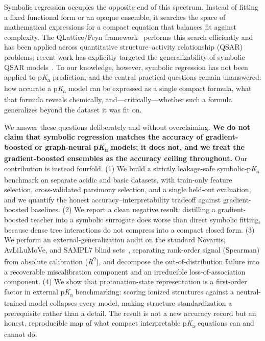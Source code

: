 \documentclass[11pt]{article}
\newcommand{\pka}{p\textit{K}\textsubscript{a}}
\newcommand{\rtwo}{\textit{R}\textsuperscript{2}}
\begin{document}
Symbolic regression occupies the opposite end of this spectrum. Instead of fitting a fixed
functional form or an opaque ensemble, it searches the space of mathematical expressions for
a compact equation that balances fit against complexity. The QLattice/Feyn
framework~\cite{brolos2021feyn} performs this search efficiently and has been applied across
quantitative structure--activity relationship (QSAR) problems; recent work has explicitly
targeted the generalizability of symbolic QSAR models~\cite{shirasawa2024figp2}. To our
knowledge, however, symbolic regression has not been applied to \pka{} prediction, and the
central practical questions remain unanswered: how accurate a \pka{} model can be expressed
as a single compact formula, what that formula reveals chemically, and---critically---whether
such a formula generalizes beyond the dataset it was fit on.

We answer these questions deliberately and without overclaiming. \textbf{We do not claim that
symbolic regression matches the accuracy of gradient-boosted or graph-neural \pka{} models;
it does not, and we treat the gradient-boosted ensembles as the accuracy ceiling throughout.}
Our contribution is instead fourfold. (1) We build a strictly leakage-safe symbolic-\pka{}
benchmark on separate acidic and basic datasets, with train-only feature selection,
cross-validated parsimony selection, and a single held-out evaluation, and we quantify the
honest accuracy--interpretability tradeoff against gradient-boosted baselines. (2) We report a
clean negative result: distilling a gradient-boosted teacher into a symbolic surrogate does
worse than direct symbolic fitting, because dense tree interactions do not compress into a
compact closed form. (3) We perform an external-generalization audit on the standard Novartis,
AvLiLuMoVe, and SAMPL7 blind sets~\cite{qiu2024sat4pka,bergazin2021sampl7}, separating
rank-order signal (Spearman) from absolute calibration (\rtwo{}), and decompose the
out-of-distribution failure into a recoverable miscalibration component and an irreducible
loss-of-association component. (4) We show that protonation-state representation is a
first-order factor in external \pka{} benchmarking: scoring ionized structures against a
neutral-trained model collapses every model, making structure standardization a prerequisite
rather than a detail. The result is not a new accuracy record but an honest, reproducible map
of what compact interpretable \pka{} equations can and cannot do.

\end{document}
